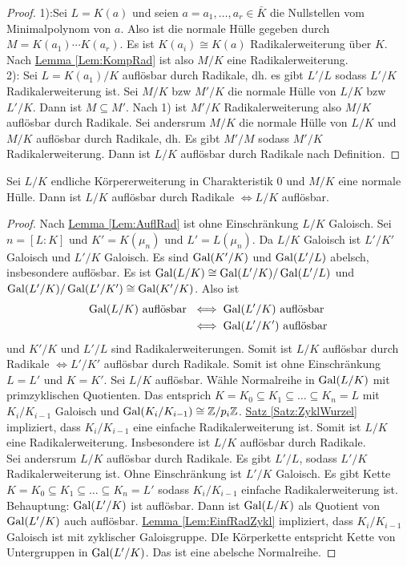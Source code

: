 \begin{proof}
    1):Sei $L=K(a)$ und seien $a=a_1,\dots,a_r\in\bar K$ die Nullstellen vom Minimalpolynom von $a$. Also ist die normale Hülle gegeben durch $M=K(a_1)\cdots K(a_r)$.
    Es ist $K(a_i)\cong K(a)$ Radikalerweiterung über $K$. Nach \hyperref[Lem:KompRad]{Lemma \ref{Lem:KompRad}} ist also $M/K$ eine Radikalerweiterung.\\
    2): Sei $L=K(a_1)/K$ auflösbar durch Radikale, dh. es gibt $L'/L$ sodass $L'/K$ Radikalerweiterung ist. Sei $M/K$ bzw $M'/K$ die normale Hülle von $L/K$ bzw $L'/K$. Dann ist $M\subseteq M'$. Nach 1) ist $M'/K$ Radikalerweiterung also $M/K$ auflösbar durch Radikale.
    Sei andersrum $M/K$ die normale Hülle von $L/K$ und $M/K$ auflösbar durch Radikale, dh. Es gibt $M'/M$ sodass $M'/K$ Radikalerweiterung. Dann ist $L/K$ auflösbar durch Radikale nach Definition.
\end{proof}
\begin{Satz}
    Sei $L/K$ endliche Körpererweiterung in Charakteristik $0$ und $M/K$ eine normale Hülle. Dann ist $L/K$ auflösbar durch Radikale $\iff L/K$ auflösbar.
\end{Satz}
\begin{proof}
    Nach \hyperref[Lem:AuflRad]{Lemma \ref{Lem:AuflRad}} ist ohne Einschränkung $L/K$ Galoisch.
    Sei $n=[L:K]$ und $K'=K(\mu_n)$ und $L'=L(\mu_n)$.
    Da $L/K$ Galoisch ist $L'/K'$ Galoisch und $L'/K$ Galoisch. Es sind $\operatorname{Gal}(K'/K)$ und $\operatorname{Gal}(L'/L)$ abelsch, insbesondere auflösbar.
    Es ist $\operatorname{Gal}(L/K)\cong \operatorname{Gal}(L'/K)/\operatorname{Gal}(L'/L)$ und $\operatorname{Gal}(L'/K)/\operatorname{Gal}(L'/K')\cong \operatorname{Gal}(K'/K)$.
    Also ist \begin{align*}
        \operatorname{Gal}(L/K)\text{ auflösbar }&\iff \operatorname{Gal}(L'/K) \text{ auflösbar}\\
        &\iff \operatorname{Gal}(L'/K') \text{ auflösbar}
    \end{align*}
    und $K'/K$ und $L'/L$ sind Radikalerweiterungen. Somit ist $L/K$ auflösbar durch Radikale $\iff L'/K'$ auflösbar durch Radikale. Somit ist ohne Einschränkung $L=L'$ und $K=K'$.
    Sei $L/K$ auflösbar. Wähle Normalreihe in $\operatorname{Gal}(L/K)$ mit primzyklischen Quotienten. Das entsprich $K=K_0\subseteq K_1\subseteq\dots\subseteq K_n=L$ mit $K_i/K_{i-1}$ Galoisch und $\operatorname{Gal}(K_i/K_{i-1})\cong \mathbb{Z}/p_i\mathbb{Z}$.  \hyperref[Satz:ZyklWurzel]{Satz \ref{Satz:ZyklWurzel}} impliziert, dass $K_i/K_{i-1}$ eine einfache Radikalerweiterung ist. Somit ist $L/K$ eine Radikalerweiterung. Insbesondere ist $L/K$ auflösbar durch Radikale.\\
    Sei andersrum $L/K$ auflösbar durch Radikale. Es gibt $L'/L$, sodass $L'/K$ Radikalerweiterung ist. Ohne Einschränkung ist $L'/K$ Galoisch. Es gibt Kette $K=K_0\subseteq K_1\subseteq\dots\subseteq K_n=L'$ sodass $K_i/K_{i-1}$ einfache Radikalerweiterung ist.
    Behauptung: $\operatorname{Gal}(L'/K)$ ist auflösbar. Dann ist $\operatorname{Gal}(L/K)$ als Quotient von $\operatorname{Gal}(L'/K)$ auch auflösbar.
    \hyperref[Lem:EinfRadZykl]{Lemma \ref{Lem:EinfRadZykl}} impliziert, dass $K_i/K_{i-1}$ Galoisch ist mit zyklischer Galoisgruppe. DIe Körperkette entspricht Kette von Untergruppen in $\operatorname{Gal}(L'/K)$. Das ist eine abelsche Normalreihe.
\end{proof}

